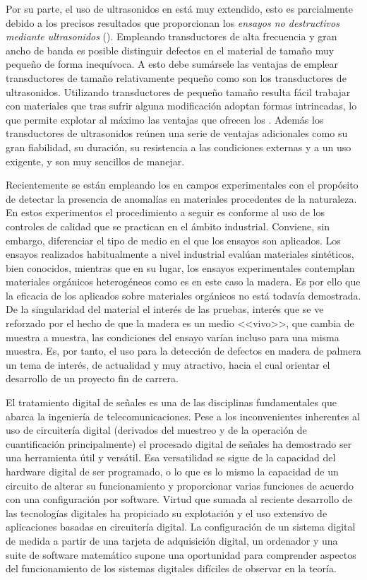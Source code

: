 Por su parte, el uso de ultrasonidos en  está muy extendido, esto
es parcialmente debido a los precisos resultados que proporcionan los
\emph{ensayos no destructivos mediante ultrasonidos} ().
Empleando transductores de alta frecuencia y gran ancho de banda es posible
distinguir defectos en el material de tamaño muy pequeño de forma
inequívoca. A esto debe sumársele las ventajas de emplear transductores de
tamaño relativamente pequeño como son los transductores de ultrasonidos.
Utilizando transductores de pequeño tamaño resulta fácil trabajar con
materiales que tras sufrir alguna modificación adoptan formas intrincadas,
lo que permite explotar al máximo las ventajas que ofrecen los .
Además los transductores de ultrasonidos reúnen una serie de ventajas
adicionales como su gran fiabilidad, su duración, su resistencia a las
condiciones externas y a un uso exigente, y son muy sencillos de
manejar.

Recientemente se están empleando los  en campos experimentales
con el propósito de detectar la presencia de anomalías en materiales
procedentes de la naturaleza. En estos experimentos el procedimiento a
seguir es conforme al uso de los controles de calidad que se practican en
el ámbito industrial. Conviene, sin embargo, diferenciar el tipo de medio
en el que los ensayos son aplicados. Los ensayos realizados habitualmente a
nivel industrial evalúan materiales sintéticos, bien conocidos, mientras
que en su lugar, los ensayos experimentales contemplan materiales orgánicos
heterogéneos como es en este caso la madera. Es por ello que la eficacia de
los  aplicados sobre materiales orgánicos no está todavía
demostrada. De la singularidad del material el interés de las pruebas,
interés que se ve reforzado por el hecho de que la madera es un medio
<<vivo>>, que cambia de muestra a muestra, las condiciones del ensayo
varían incluso para una misma muestra. Es, por tanto, el uso 
para la detección de defectos en madera de palmera un tema de interés, de
actualidad y muy atractivo, hacia el cual orientar el desarrollo de un
proyecto fin de carrera.



El tratamiento digital de señales es una de las disciplinas fundamentales
que abarca la ingeniería de telecomunicaciones. Pese a los inconvenientes
inherentes al uso de circuitería digital (derivados del muestreo y de la
operación de cuantificación principalmente) el procesado digital de señales
ha demostrado ser una herramienta útil y versátil. Esa versatilidad se
sigue de la capacidad del hardware digital de ser programado, o lo que es
lo mismo la capacidad de un circuito de alterar su funcionamiento y
proporcionar varias funciones de acuerdo con una configuración por
software. Virtud que sumada al reciente desarrollo de las tecnologías
digitales ha propiciado su explotación y el uso extensivo de aplicaciones
basadas en circuitería digital. La configuración de un sistema digital de
medida a partir de una tarjeta de adquisición digital, un ordenador y una
suite de software matemático supone una oportunidad para comprender
aspectos del funcionamiento de los sistemas digitales difíciles de observar
en la teoría.


